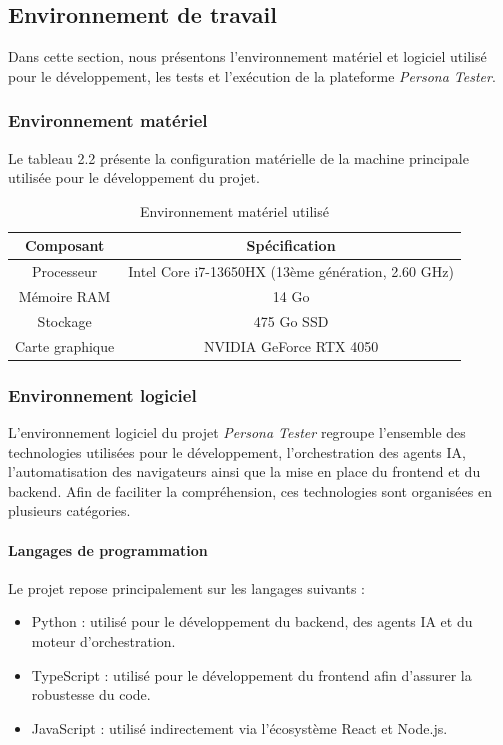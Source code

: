 \subsection{Environnement de travail}


Dans cette section, nous présentons l’environnement matériel et logiciel utilisé pour le développement, les tests et l’exécution de la plateforme \textit{Persona Tester}.\\


\subsubsection{Environnement matériel}

Le tableau 2.2 présente la configuration matérielle de la machine principale utilisée pour le développement du projet.

\begin{table}[H]
\centering
\begin{tabular}{|c|c|}
\hline
\textbf{Composant} & \textbf{Spécification} \\
\hline
Processeur & Intel Core i7-13650HX (13ème génération, 2.60 GHz) \\
\hline
Mémoire RAM & 14 Go \\
\hline
Stockage & 475 Go SSD \\
\hline
Carte graphique & NVIDIA GeForce RTX 4050 \\
\hline
\end{tabular}
\caption{Environnement matériel utilisé}
\end{table}

\subsubsection{Environnement logiciel}

L’environnement logiciel du projet \textit{Persona Tester} regroupe l’ensemble des technologies utilisées pour le développement, l’orchestration des agents IA, l’automatisation des navigateurs ainsi que la mise en place du frontend et du backend. Afin de faciliter la compréhension, ces technologies sont organisées en plusieurs catégories.

\paragraph{Langages de programmation}

Le projet repose principalement sur les langages suivants :
\begin{itemize}
    \item Python : utilisé pour le développement du backend, des agents IA et du moteur d’orchestration.
    \item TypeScript : utilisé pour le développement du frontend afin d’assurer la robustesse du code.
    \item JavaScript : utilisé indirectement via l’écosystème React et Node.js.
\end{itemize}

